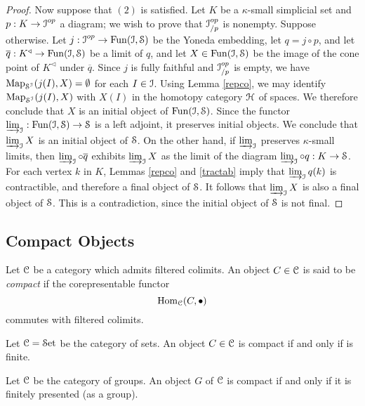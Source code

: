 \begin{proof}
Now suppose that $(2)$ is satisfied. Let $K$ be a $\kappa$-small simplicial set and
$p: K \rightarrow \calI^{op}$ a diagram; we wish to prove that $\calI^{op}_{/p}$ is nonempty.
Suppose otherwise. Let $j: \calI^{op} \rightarrow \Fun(\calI,\SSet)$ be the Yoneda embedding, let
$q = j \circ p$, and let $\overline{q}: K^{\triangleleft} \rightarrow \Fun(\calI,\SSet)$ be a limit of
$q$, and let $X \in \Fun(\calI,\SSet)$ be the image of the cone point of $K^{\triangleleft}$
under $\overline{q}$. Since $j$ is fully faithful and $\calI^{op}_{/p}$ is empty, we have
$\bHom_{ \SSet^{\calI} }(j(I), X) = \emptyset$ for each $I \in \calI$. Using Lemma \ref{repco}, we may identify $\bHom_{ \SSet^{\calI} }(j(I),X)$ with $X(I)$ in the homotopy category $\calH$ of spaces. We therefore conclude that $X$ is an initial object of $\Fun(\calI,\SSet)$. Since the functor $\colim_{\calI}: \Fun(\calI,\SSet) \rightarrow \SSet$ is a left adjoint, it preserves initial objects. We conclude that $\colim_{\calI} X$ is an initial object of $\SSet$.
On the other hand, if $\colim_{\calI}$ preserves $\kappa$-small limits, then
$\colim_{\calI} \circ \overline{q}$ exhibits $\colim_{\calI} X$ as the limit of the diagram
$\colim_{\calI} \circ q: K \rightarrow \SSet$. For each vertex $k$ in $K$, Lemmas \ref{repco} and \ref{tractab} imply that $\colim_{\calI} q(k)$ is contractible, and therefore a final object of $\SSet$. It follows that
$\colim_{\calI} X$ is also a final object of $\SSet$. This is a contradiction, since the initial object
of $\SSet$ is not final.
\end{proof}

\subsection{Compact Objects}\label{compobj}

Let $\calC$ be a category which admits filtered colimits. An object $C \in \calC$ is said to be {\it compact} if the corepresentable functor $$ \Hom_{\calC}(C, \bigdot)$$ commutes with filtered colimits.

\begin{example}
Let $\calC = \Set$ be the category of sets. An object $C \in \calC$ is compact if and only if
is finite.
\end{example}

\begin{example}\label{compactgroup}
Let $\calC$ be the category of groups. An object $G$ of $\calC$ is compact if and only if 
it is finitely presented (as a group).
\end{example}

